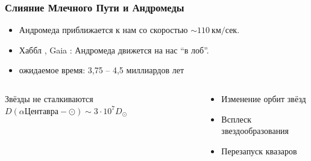 \documentclass[aspectratio=169]{beamer}
\begin{document}
\begin{frame}
\frametitle{Слияние Млечного Пути и Андромеды}
\begin{itemize}
\item Андромеда приближается к нам со скоростью $\sim 110 \: \text{км}/\text{сек}$.
\item Хаббл \cite{arXiv:1205.6864}, Gaia \cite{arXiv:1805.04079}: Андромеда движется на нас ``в лоб''.
\item ожидаемое время: 3,75 -- 4,5 миллиардов лет
\end{itemize}
\begin{columns}[c]
\begin{block}{Звёзды не сталкиваются}
$D(\alpha \text{Центавра}- \odot) \sim 3 \cdot 10^7 D_\odot$
\end{block}
\begin{block}{}
\begin{itemize}
\item Изменение орбит звёзд
\item Всплеск звездообразования
\item Перезапуск квазаров
\end{itemize}
\end{block}
\end{columns}
\end{frame}
\end{document}
